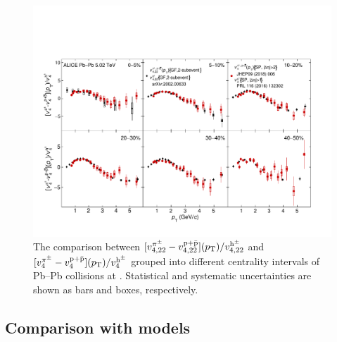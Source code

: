 \begin{figure}[!htb]
\begin{center}
\includegraphics[scale=0.6]{figures/results/massOrdering_vn_pion_proton_to_charged.pdf}
\end{center}
\caption{The comparison between $[v_{4,22}^{\pi^{\pm}} -  v_{4,22}^{\rm p+\bar{p}}](p_{\rm T}) / v_{4,22}^{\rm h^{\pm}} $ and $[v_{4}^{\pi^{\pm}} -  v_{4}^{\rm p+\bar{p}}](p_{\rm T}) / v_{4}^{\rm h^{\pm}} $  grouped into different centrality intervals of Pb--Pb collisions at \sNN. Statistical and systematic uncertainties are shown as bars and boxes, respectively.}
\label{massOrderingComparison}
\end{figure}

\newpage
\subsection{Comparison with models}
\label{SubSec:hydro}

